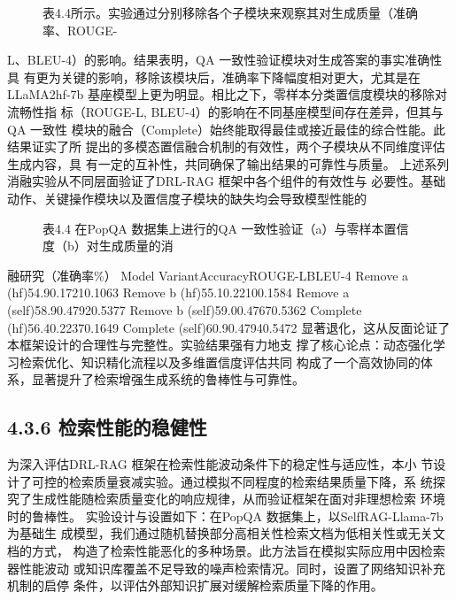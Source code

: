 \documentclass[12pt,a4paper,openright,UTF8]{ctexbook}
\begin{document}
\begin{figure}[htbp]
\centering
{}
\caption{表4.4所示。实验通过分别移除各个子模块来观察其对生成质量（准确率、ROUGE-}
\end{figure}

L、BLEU-4）的影响。结果表明，QA 一致性验证模块对生成答案的事实准确性具 有更为关键的影响，移除该模块后，准确率下降幅度相对更大，尤其是在LLaMA2hf-7b 基座模型上更为明显。相比之下，零样本分类置信度模块的移除对流畅性指 标（ROUGE-L, BLEU-4）的影响在不同基座模型间存在差异，但其与QA 一致性 模块的融合（Complete）始终能取得最佳或接近最佳的综合性能。此结果证实了所 提出的多模态置信融合机制的有效性，两个子模块从不同维度评估生成内容，具 有一定的互补性，共同确保了输出结果的可靠性与质量。 上述系列消融实验从不同层面验证了DRL-RAG 框架中各个组件的有效性与 必要性。基础动作、关键操作模块以及置信度子模块的缺失均会导致模型性能的

\begin{figure}[htbp]
\centering
{}
\caption{表4.4 在PopQA 数据集上进行的QA 一致性验证（a）与零样本置信度（b）对生成质量的消}
\end{figure}

融研究（准确率\%） Model VariantAccuracyROUGE-LBLEU-4 Remove a (hf)54.90.17210.1063 Remove b (hf)55.10.22100.1584 Remove a (self)58.90.47920.5377 Remove b (self)59.00.47670.5362 Complete (hf)56.40.22370.1649 Complete (self)60.90.47940.5472 显著退化，这从反面论证了本框架设计的合理性与完整性。实验结果强有力地支 撑了核心论点：动态强化学习检索优化、知识精化流程以及多维置信度评估共同 构成了一个高效协同的体系，显著提升了检索增强生成系统的鲁棒性与可靠性。

\subsection{4.3.6 检索性能的稳健性}

为深入评估DRL-RAG 框架在检索性能波动条件下的稳定性与适应性，本小 节设计了可控的检索质量衰减实验。通过模拟不同程度的检索结果质量下降，系 统探究了生成性能随检索质量变化的响应规律，从而验证框架在面对非理想检索 环境时的鲁棒性。 实验设计与设置如下：在PopQA 数据集上，以SelfRAG-Llama-7b 为基础生 成模型，我们通过随机替换部分高相关性检索文档为低相关性或无关文档的方式， 构造了检索性能恶化的多种场景。此方法旨在模拟实际应用中因检索器性能波动 或知识库覆盖不足导致的噪声检索情况。同时，设置了网络知识补充机制的启停 条件，以评估外部知识扩展对缓解检索质量下降的作用。
\end{document}

